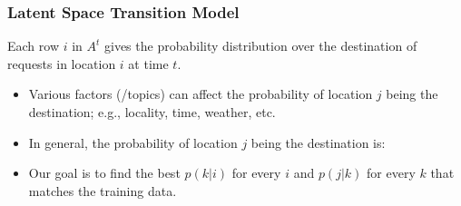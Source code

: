 \documentclass[t]{beamer}
\begin{document}
\begin{frame}\frametitle{Latent Space Transition Model}
Each row $i$ in $A^t$ gives the probability distribution over the destination of requests in location $i$ at time $t$.
\begin{itemize}
\item<2-> Various factors (/topics) can affect the probability of location $j$ being the destination; e.g., locality, time, weather, etc.
\item<4-> In general, the probability of location $j$ being the destination is:
\item<5-> Our goal is to find the best $p(k|i)$ for every $i$ and $p(j|k)$ for every $k$ that matches the training data.
\end{itemize}
\end{frame}
\end{document}
